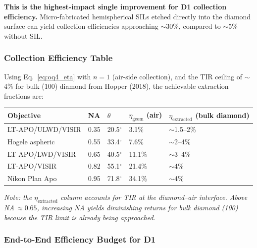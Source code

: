 \textbf{This is the highest-impact single improvement for D1 collection
efficiency.} Micro-fabricated hemispherical SILs etched directly into
the diamond surface can yield collection efficiencies approaching
$\sim$30\%, compared to $\sim$5\% without SIL.\cite{Hadden2010SIL}

\subsubsection{Collection Efficiency Table}

Using Eq.~\eqref{eq:oq4_eta} with $n = 1$ (air-side collection), and the
TIR ceiling of $\sim$4\% for bulk (100) diamond from Hopper
(2018),\cite{Hopper2018}
the achievable extraction fractions are:

\begin{center}
\small
\begin{tabular}{lllll}
\toprule
\textbf{Objective} & \textbf{NA} & $\theta$ & $\eta_\text{geom}$ (air) & $\eta_\text{extracted}$ (bulk diamond) \\
\midrule
LT-APO/ULWD/VISIR & 0.35\cite{AttocubeULWD_web} & 20.5$^\circ$ & 3.1\% & $\sim$1.5--2\% \\
Hogele aspheric & 0.55\cite{Hogele2008} & 33.4$^\circ$ & 7.6\% & $\sim$2--4\% \\
LT-APO/LWD/VISIR & 0.65\cite{AttocubeLTAPOLWD_web} & 40.5$^\circ$ & 11.1\% & $\sim$3--4\% \\
LT-APO/VISIR & 0.82\cite{AttocubeLTAPO_web} & 55.1$^\circ$ & 21.4\% & $\sim$4\% \\
Nikon Plan Apo & 0.95\cite{arXiv2502.16599} & 71.8$^\circ$ & 34.1\% & $\sim$4\% \\
\bottomrule
\end{tabular}
\end{center}

\textit{Note: the $\eta_\text{extracted}$ column accounts for TIR at the
diamond--air interface. Above NA\,$\approx 0.65$, increasing NA yields
diminishing returns for bulk diamond (100) because the TIR limit is already
being approached.}

\subsubsection{End-to-End Efficiency Budget for D1}

